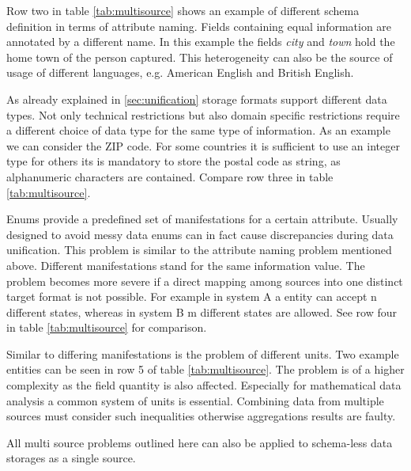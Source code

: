 Row two in table \ref{tab:multisource} shows an example of different schema definition in terms of attribute naming. Fields containing equal information are annotated by a different name. In this example the fields \textit{city} and \textit{town} hold the home town of the person captured. This heterogeneity can also be the source of usage of different languages, e.g. American English and British English. 

As already explained in \ref{sec:unification} storage formats support different data types. Not only technical restrictions but also domain specific restrictions require a different choice of data type for the same type of information. As an example we can consider the ZIP code. For some countries it is sufficient to use an integer type for others its is mandatory to store the postal code as string, as alphanumeric characters are contained. Compare row three in table \ref{tab:multisource}. 

Enums provide a predefined set of manifestations for a certain attribute. Usually designed to avoid messy data enums can in fact cause discrepancies during data unification. This problem is similar to the attribute naming problem mentioned above. Different manifestations stand for the same information value. The problem becomes more severe if a direct mapping among sources into one distinct target format is not possible. For example in system A a entity can accept n different states, whereas in system B m different states are allowed. See row four in table \ref{tab:multisource} for comparison.

Similar to differing manifestations is the problem of different units. Two example entities can be seen in row 5 of table \ref{tab:multisource}. The problem is of a higher complexity as the field quantity is also affected. Especially for mathematical data analysis a common system of units is essential. Combining data from multiple sources must consider such inequalities otherwise aggregations results are faulty.

All multi source problems outlined here can also be applied to schema-less data storages as a single source. 

